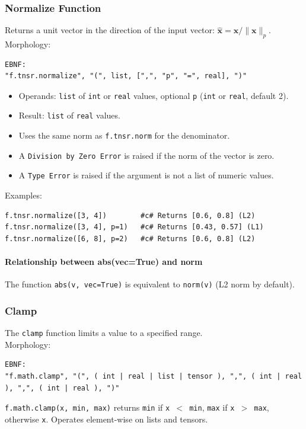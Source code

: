 \subsubsection{Normalize Function}
Returns a unit vector in the direction of the input vector: $\hat{\mathbf{x}} = \mathbf{x} / \|\mathbf{x}\|_p$. \\
Morphology:
\begin{verbatim}
EBNF:
"f.tnsr.normalize", "(", list, [",", "p", "=", real], ")"
\end{verbatim}
\begin{itemize}
\item Operands: \texttt{list} of \texttt{int} or \texttt{real} values, optional \texttt{p} (\texttt{int} or \texttt{real}, default 2).
\item Result: \texttt{list} of \texttt{real} values.
\item Uses the same norm as \texttt{f.tnsr.norm} for the denominator.
\item A \texttt{Division by Zero Error} is raised if the norm of the vector is zero.
\item A \texttt{Type Error} is raised if the argument is not a list of numeric values.
\end{itemize}
Examples:
\begin{verbatim}
f.tnsr.normalize([3, 4])        #c# Returns [0.6, 0.8] (L2)
f.tnsr.normalize([3, 4], p=1)   #c# Returns [0.43, 0.57] (L1)
f.tnsr.normalize([6, 8], p=2)   #c# Returns [0.6, 0.8] (L2)
\end{verbatim}

\paragraph{Relationship between abs(vec=True) and norm}
The function \texttt{abs(v, vec=True)} is equivalent to \texttt{norm(v)} (L2 norm by default).

\subsubsection{Clamp}
The \texttt{clamp} function limits a value to a specified range.\\
Morphology:
\begin{verbatim}
EBNF:
"f.math.clamp", "(", ( int | real | list | tensor ), ",", ( int | real ), ",", ( int | real ), ")"
\end{verbatim}
\texttt{f.math.clamp(x, min, max)} returns \texttt{min} if \texttt{x $<$ min}, \texttt{max} if \texttt{x $>$ max}, otherwise \texttt{x}.
Operates element-wise on lists and tensors.\\
